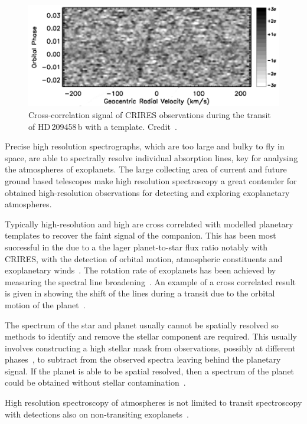 \begin{figure}
    \centering
    \includegraphics[width=0.7\linewidth]{figures/introduction/snellen2010}
    \caption{Cross-correlation signal of CRIRES observations during the transit of HD\,209458\,b with a  template.
Credit~\citet{snellen_orbital_2010}.}
    \label{fig:snellen2010}
\end{figure}

Precise high resolution spectrographs, which are too large and bulky to fly in space, are able to spectrally resolve individual absorption lines, key for analysing the atmospheres of exoplanets.
The large collecting area of current and future ground based telescopes make high resolution spectroscopy a great contender for obtained high-resolution observations for detecting and exploring exoplanetary atmospheres.

Typically high-resolution and high \snr{} are cross correlated with modelled planetary templates to recover the faint signal of the companion.
This has been most successful in the \nir{} due to a the lager planet-to-star flux ratio
notably with CRIRES, with the detection of orbital motion, atmospheric constituents and exoplanetary winds~\citep[e.g.][]{snellen_orbital_2010, dekok_detection_2013, brogi_carbon_2014, brogi_rotation_2016, schwarz_evidence_2015}.
The rotation rate of exoplanets has been achieved by measuring the spectral line broadening~\citep{snellen_fast_2014, brogi_rotation_2016}.
An example of a cross correlated result is given in  showing the shift of the  lines during a transit due to the orbital motion of the planet~\citep{snellen_orbital_2010}.

The spectrum of the star and planet usually cannot be spatially resolved so methods to identify and remove the stellar component are required.
This usually involves constructing a high \snr{} stellar mask from observations, possibly at different phases~\citep[e.g.][]{rodler_weighing_2012}, to subtract from the observed spectra leaving behind the planetary signal.  If the planet is able to be spatial resolved, then a spectrum of the planet could be obtained without stellar contamination~\citep[e.g.][]{snellen_combining_2015}.

High resolution spectroscopy of atmospheres is not limited to transit spectroscopy with detections also on non-transiting exoplanets~\citet{brogi_signature_2012, brogi_carbon_2014,lockwood_nearir_2014, piskorz_evidence_2016}.
